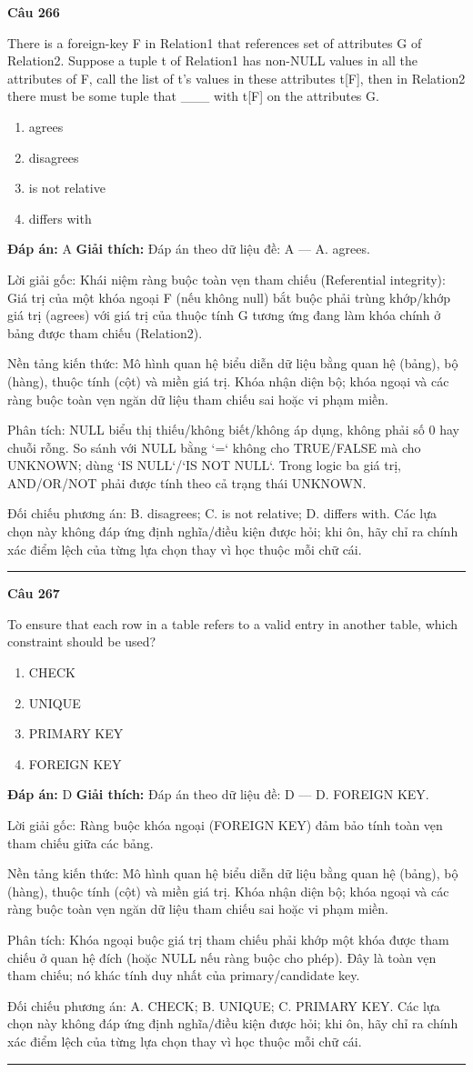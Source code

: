 \documentclass[11pt,a4paper]{article}
\newenvironment{question}[1]{%
  \par\vspace{1em}\noindent\textbf{\large Câu #1}\par\vspace{0.4em}
}{%
  \par\vspace{1em}\hrule\vspace{0.6em}
}
\newenvironment{choices}{%
  \begin{enumerate}[label=\textbf{\Alph*.},leftmargin=2.2em,itemsep=2pt,topsep=3pt]
}{%
  \end{enumerate}
}
\newcommand{\choice}{\item}
\begin{document}
\begin{question}{266}
There is a foreign-key F in Relation1 that references set of attributes G of Relation2. Suppose a tuple t of Relation1 has non-NULL values in all the attributes of F, call the list of t's values in these attributes t[F], then in Relation2 there must be some tuple that ___ with t[F] on the attributes G.
\begin{choices}
\choice agrees
\choice disagrees
\choice is not relative
\choice differs with
\end{choices}
\textbf{Đáp án:} A
\textbf{Giải thích:} Đáp án theo dữ liệu đề: A — A. agrees.

Lời giải gốc: Khái niệm ràng buộc toàn vẹn tham chiếu (Referential integrity): Giá trị của một khóa ngoại F (nếu không null) bắt buộc phải trùng khớp/khớp giá trị (agrees) với giá trị của thuộc tính G tương ứng đang làm khóa chính ở bảng được tham chiếu (Relation2).

Nền tảng kiến thức: Mô hình quan hệ biểu diễn dữ liệu bằng quan hệ (bảng), bộ (hàng), thuộc tính (cột) và miền giá trị. Khóa nhận diện bộ; khóa ngoại và các ràng buộc toàn vẹn ngăn dữ liệu tham chiếu sai hoặc vi phạm miền.

Phân tích: NULL biểu thị thiếu/không biết/không áp dụng, không phải số 0 hay chuỗi rỗng. So sánh với NULL bằng `=` không cho TRUE/FALSE mà cho UNKNOWN; dùng `IS NULL`/`IS NOT NULL`. Trong logic ba giá trị, AND/OR/NOT phải được tính theo cả trạng thái UNKNOWN.

Đối chiếu phương án: B. disagrees; C. is not relative; D. differs with. Các lựa chọn này không đáp ứng định nghĩa/điều kiện được hỏi; khi ôn, hãy chỉ ra chính xác điểm lệch của từng lựa chọn thay vì học thuộc mỗi chữ cái.
\end{question}

\begin{question}{267}
To ensure that each row in a table refers to a valid entry in another table, which constraint should be used?
\begin{choices}
\choice CHECK
\choice UNIQUE
\choice PRIMARY KEY
\choice FOREIGN KEY
\end{choices}
\textbf{Đáp án:} D
\textbf{Giải thích:} Đáp án theo dữ liệu đề: D — D. FOREIGN KEY.

Lời giải gốc: Ràng buộc khóa ngoại (FOREIGN KEY) đảm bảo tính toàn vẹn tham chiếu giữa các bảng.

Nền tảng kiến thức: Mô hình quan hệ biểu diễn dữ liệu bằng quan hệ (bảng), bộ (hàng), thuộc tính (cột) và miền giá trị. Khóa nhận diện bộ; khóa ngoại và các ràng buộc toàn vẹn ngăn dữ liệu tham chiếu sai hoặc vi phạm miền.

Phân tích: Khóa ngoại buộc giá trị tham chiếu phải khớp một khóa được tham chiếu ở quan hệ đích (hoặc NULL nếu ràng buộc cho phép). Đây là toàn vẹn tham chiếu; nó khác tính duy nhất của primary/candidate key.

Đối chiếu phương án: A. CHECK; B. UNIQUE; C. PRIMARY KEY. Các lựa chọn này không đáp ứng định nghĩa/điều kiện được hỏi; khi ôn, hãy chỉ ra chính xác điểm lệch của từng lựa chọn thay vì học thuộc mỗi chữ cái.
\end{question}
\end{document}

